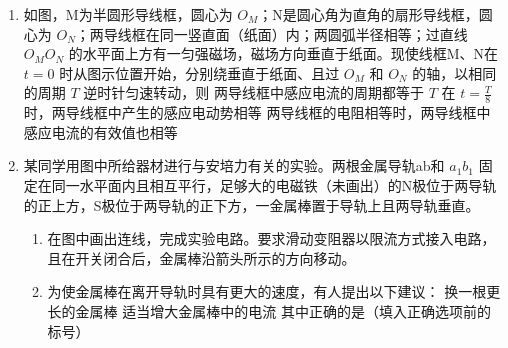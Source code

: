 \documentclass[\gkver]{gaokaozhenti}
\begin{document}
\begin{enumerate}

\item
如图，M为半圆形导线框，圆心为 $O_{M}$；N是圆心角为直角的扇形导线框，圆心为 $O_{N}$；两导线框在同一竖直面（纸面）内；两圆弧半径相等；过直线 $O_{M}O_{N}$ 的水平面上方有一匀强磁场，磁场方向垂直于纸面。现使线框M、N在 $t=0$ 时从图示位置开始，分别绕垂直于纸面、且过 $O_{M}$ 和 $O_{N}$ 的轴，以相同的周期 $T$ 逆时针匀速转动，则
{两导线框中感应电流的周期都等于 $T$}
{在 $t=\frac{T}{8}$ 时，两导线框中产生的感应电动势相等}
{两导线框的电阻相等时，两导线框中感应电流的有效值也相等}


\item
某同学用图中所给器材进行与安培力有关的实验。两根金属导轨ab和 $a_{1}b_{1}$ 固定在同一水平面内且相互平行，足够大的电磁铁（未画出）的N极位于两导轨的正上方，S极位于两导轨的正下方，一金属棒置于导轨上且两导轨垂直。
\begin{enumerate}
	\item
	在图中画出连线，完成实验电路。要求滑动变阻器以限流方式接入电路，且在开关闭合后，金属棒沿箭头所示的方向移动。
	\item
	为使金属棒在离开导轨时具有更大的速度，有人提出以下建议：
	{换一根更长的金属棒}
	{适当增大金属棒中的电流}
	其中正确的是（填入正确选项前的标号）
\end{enumerate}



\end{enumerate}
\end{document}

